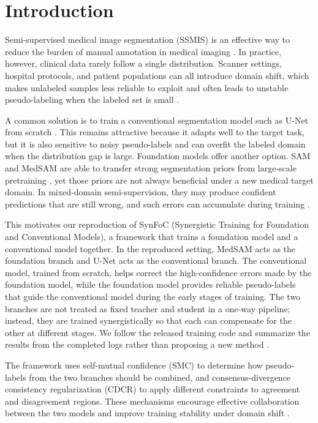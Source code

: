 \section{Introduction}
Semi-supervised medical image segmentation (SSMIS) is an effective way to reduce the burden of manual annotation in medical imaging \cite{tarvainen2017mean,chen2021semi,yu2019uncertainty,grunberg2017annotating}. In practice, however, clinical data rarely follow a single distribution. Scanner settings, hospital protocols, and patient populations can all introduce domain shift, which makes unlabeled samples less reliable to exploit and often leads to unstable pseudo-labeling when the labeled set is small \cite{ma2024constructing}.

A common solution is to train a conventional segmentation model such as U-Net from scratch \cite{ronneberger2015u}. This remains attractive because it adapts well to the target task, but it is also sensitive to noisy pseudo-labels and can overfit the labeled domain when the distribution gap is large. Foundation models offer another option. SAM and MedSAM are able to transfer strong segmentation priors from large-scale pretraining \cite{kirillov2023segment,ma2024segment}, yet those priors are not always beneficial under a new medical target domain. In mixed-domain semi-supervision, they may produce confident predictions that are still wrong, and such errors can accumulate during training \cite{ma2024constructing}.

This motivates our reproduction of SynFoC (Synergistic Training for Foundation and Conventional Models), a framework that trains a foundation model and a conventional model together. In the reproduced setting, MedSAM acts as the foundation branch and U-Net acts as the conventional branch. The conventional model, trained from scratch, helps correct the high-confidence errors made by the foundation model, while the foundation model provides reliable pseudo-labels that guide the conventional model during the early stages of training. The two branches are not treated as fixed teacher and student in a one-way pipeline; instead, they are trained synergistically so that each can compensate for the other at different stages. We follow the released training code and summarize the results from the completed logs rather than proposing a new method \cite{ma2024constructing}.

The framework uses self-mutual confidence (SMC) to determine how pseudo-labels from the two branches should be combined, and consensus-divergence consistency regularization (CDCR) to apply different constraints to agreement and disagreement regions. These mechanisms encourage effective collaboration between the two models and improve training stability under domain shift \cite{ma2024constructing}.

